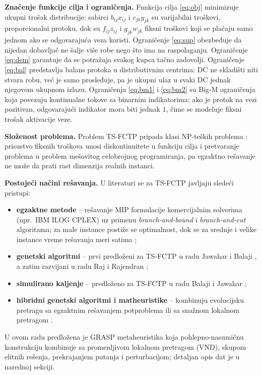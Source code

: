 \documentclass[12pt,a4paper]{article}
\begin{document}
\textbf{Značenje funkcije cilja i ograničenja.}
Funkcija cilja \eqref{eq:obj} minimizuje ukupni trošak distribucije: sabirci
$b_{ij}x_{ij}$ i $c_{jk}y_{jk}$ su varijabilni troškovi, proporcionalni
protoku, dok su $f_{ij}z_{ij}$ i $g_{jk}w_{jk}$ fiksni troškovi koji se plaćaju
samo jednom ako se odgovarajuća veza koristi. Ograničenje \eqref{eq:sup} obezbeđuje
da nijedan dobavljač ne šalje više robe nego što ima na raspolaganju.
Ograničenje \eqref{eq:dem} garantuje da se potražnja svakog kupca tačno
zadovolji. Ograničenje \eqref{eq:bal} predstavlja balans protoka u
distributivnim centrima: DC ne skladišti niti stvara robu, već je samo
prosleđuje, pa je ukupni ulaz u svaki DC jednak njegovom ukupnom izlazu.
Ograničenja \eqref{eq:bm1} i \eqref{eq:bm2} su Big-M ograničenja koja povezuju
kontinualne tokove sa binarnim indikatorima: ako je protok na vezi pozitivan,
odgovarajući indikator mora biti jednak $1$, čime se modeluje fiksni trošak
aktivacije veze.

\textbf{Složenost problema.}
Problem TS-FCTP pripada klasi NP-teških problema \cite{jb2009}: prisustvo
fiksnih troškova unosi diskontinuitete u funkciju cilja i pretvaranje
problema u problem mešovitog celobrojnog programiranja, pa egzaktno rešavanje
ne može da prati rast dimenzija realnih instanci.

\textbf{Postojeći načini rešavanja.}
U literaturi se za TS-FCTP javljaju sledeći pristupi:
\begin{itemize}
  \item \textbf{egzaktne metode} -- rešavanje MIP formulacije komercijalnim
    solverima (npr.\ IBM ILOG CPLEX) uz primenu \textit{branch-and-bound} i
    \textit{branch-and-cut} algoritama; za male instance postiže se
    optimalnost, dok se za srednje i velike instance vreme rešavanja meri
    satima \cite{calvete2018};
  \item \textbf{genetski algoritmi} -- prvi predloženi za TS-FCTP u radu
    Jawahar i Balaji \cite{jb2009}, a zatim razvijani u radu Raj i Rajendran
    \cite{raj2012};
  \item \textbf{simulirano kaljenje} -- predloženo za TS-FCTP u radu Balaji i
    Jawahar \cite{balaji2010};
  \item \textbf{hibridni genetski algoritmi i matheuristike} -- kombinuju
    evolucijsku pretragu sa egzaktnim rešavanjem potproblema ili sa snažnom
    lokalnom pretragom \cite{pop2016, calvete2018}.
\end{itemize}
U ovom radu predložena je GRASP metaheuristika koja pohlepno-nasumičnu
konstrukciju kombinuje sa promenljivom lokalnom pretragom (VND), skupom
elitnih rešenja, prekrajanjem putanja i perturbacijom; detaljan opis dat je u
narednoj sekciji.
\end{document}
